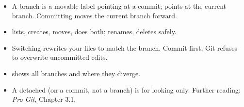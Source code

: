 \begin{itemize}
  \item A branch is a movable label pointing at a commit;  points at the current branch. Committing moves the current branch forward.
  \item {} lists,  creates,  moves,  does both;  renames,  deletes safely.
  \item Switching rewrites your files to match the branch. Commit first; Git refuses to overwrite uncommitted edits.
  \item {} shows all branches and where they diverge.
  \item A detached  (on a commit, not a branch) is for looking only. Further reading: \emph{Pro Git}, Chapter 3.1.
\end{itemize}


\solutionspage




